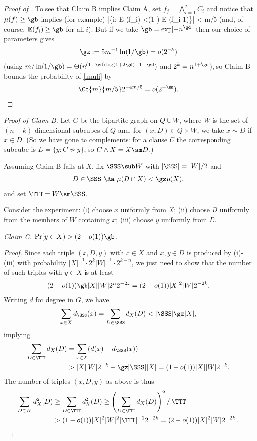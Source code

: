 \begin{proof}[Proof of ]
\medskip
To see that Claim B implies Claim A,
set $f_j=\bigwedge_{i=1}^jC_i$ and notice that $\mu(f) \geq \gb$
implies (for example)
%
%
\left|\left\{i: \mathbb E (f_i) <\left(1-\right)
\mathbb E (f_{i-1})\right\}\right| < m/5
%
\enq
(and, of course, $\mathbb E (f_i)\geq \gb$ for all $i$).
But if we take
$\gb =\exp[-n^{\gd}]$ then our choice of parameters gives
$$\gz:=5m^{-1}\ln(1/\gb) =o(2^{-k})$$
(using $m/\ln (1/\gb) =
\Theta(n^{(1+\gd)\log (1+2\gd)+1-\gd})$ and
$2^k = n^{1+\gd}$),
so Claim B bounds the probability of \eqref{imufi} by
%
\begin{equation*}
\Cc{m}{m/5} 2^{-4m/5} =o(2^{-\nn}).   \qedhere    %
\end{equation*}
%
\end{proof}   %

\mn
\emph{Proof of Claim B.}
Let $G$ be the bipartite graph on
$Q\cup W$, where $W$ is the set of $(n-k)$-dimensional
subcubes of $Q$ and, for $(x,D)\in Q\times W$,
we take $x\sim D$ if $x\in D$.
(So %
we have  %
gone to complements:  for a clause $C$
the corresponding subcube is $D=\{y:C\not\sim y\}$,
so $C\wedge X =X\sm D$.)

Assuming Claim B fails at $X$, fix $\SSS \sub W$ with $|\SSS |=|W|/2$ and
$$D\in \SSS
  ~\Ra ~\mu (D\cap X) < \gz\mu(X),$$
and set $\TTT =W\sm \SSS $.

%
Consider the experiment:  %
(i) choose $x$ uniformly from $X$;
(ii)  choose $D$ uniformly from the members of $W$ containing $x$;
(iii)  choose $y$ uniformly from $D$.


\mn
\emph{Claim C.}  $\Pr(y\in X)> (2-o(1))\gb$.


\mn
\begin{proof}   %
%
Since each triple $(x,D,y)$ with $x\in X$ and $x,y\in D$ is
produced by (i)-(iii) with probability
$|X|^{-1}\cdot 2^k|W|^{-1}\cdot 2^{k-n}$,
we just need to show that the number of such triples with
$y\in X$ is at least
$$
(2-o(1))\gb |X||W|2^n2^{-2k}  = (2-o(1))|X|^2|W|2^{-2k}.
$$
Writing $d$ for degree in $G$, we have
$$
\sum_{x\in X}d_\SSS(x) =\sum_{D\in \SSS }d_X(D) < |\SSS |\gz
 |X|,
$$
implying
%
\begin{align*}
\sum_{D\in \TTT }d_X(D)& = 
\sum_{x\in X}(d(x)-d_\SSS (x))\\
&> |X||W|2^{-k} - \gz |\SSS ||X| = (1-o(1))|X||W|2^{-k}.
\end{align*}   %
The number of %
triples $(x,D,y)$  %
as above is thus
%
\begin{align*}
\sum_{D\in W} d_X^2(D)
&\geq
\sum_{D\in \TTT } d_X^2(D)
\geq
\left(\sum_{D\in \TTT } d_X(D)\right)^2/|\TTT |\\   %
&> (1-o(1))|X|^2|W|^2|\TTT |^{-1}2^{-2k}
= (2-o(1))|X|^2|W|2^{-2k}\,.
 \qedhere                          
\end{align*}   %
%
\end{proof}   %

